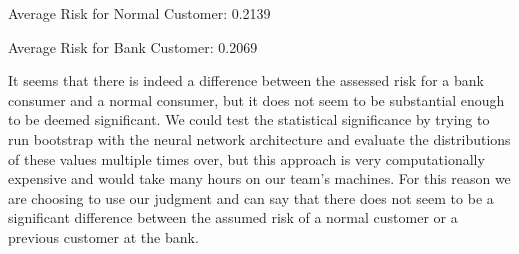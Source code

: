 \documentclass[12pt]{article}
\begin{document}
	Average Risk for Normal Customer: 0.2139 
	
	Average Risk for Bank Customer: 0.2069
	
	It seems that there is indeed a difference between the assessed risk for a bank consumer and a normal consumer, but it does not seem to be substantial enough to be deemed significant. We could test the statistical significance by trying to run bootstrap with the neural network architecture and evaluate the distributions of these values multiple times over, but this approach is very computationally expensive and would take many hours on our team's machines. For this reason we are choosing to use our judgment and can say that there does not seem to be a significant difference between the assumed risk of a normal customer or a previous customer at the bank. 
	

	
\end{document}
